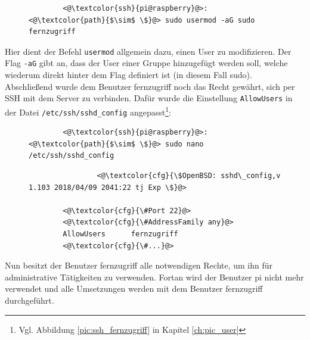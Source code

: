 \documentclass[a4paper, 11pt]{scrartcl}
\begin{document}
\begin{figure}[H]
    \begin{mdframed}[backgroundcolor=bbg]
        \begin{lstlisting}
        <@\textcolor{ssh}{pi@raspberry}@>:<@\textcolor{path}{$\sim$ \$}@> sudo usermod -aG sudo fernzugriff
        \end{lstlisting}
    \end{mdframed}
    \label{lst:usermod_fernzugriff}
\end{figure}
Hier dient der Befehl \lstinline[basicstyle={\small\ttfamily\color{black}}]|usermod| allgemein dazu, einen User zu modifizieren. Der Flag \lstinline[basicstyle={\small\ttfamily\color{black}}]|-aG| gibt an,
dass der User einer Gruppe hinzugefügt werden soll, welche wiederum direkt hinter dem Flag definiert ist (in diesem Fall \glqq sudo\grqq).
\\
Abschließend wurde dem Benutzer \glqq fernzugriff\grqq{} noch das Recht gewährt, sich per SSH mit dem Server zu verbinden. Dafür wurde die Einstellung \lstinline[basicstyle={\small\ttfamily\color{black}}]|AllowUsers|
in der Datei \lstinline[basicstyle={\small\ttfamily\color{black}}]|/etc/ssh/sshd_config| angepasst\footnote{Vgl. Abbildung \ref{pic:ssh_fernzugriff} in Kapitel \ref{ch:pic_user}}:

\begin{figure}[H]
    \begin{mdframed}[backgroundcolor=bbg]
        \begin{lstlisting}
        <@\textcolor{ssh}{pi@raspberry}@>:<@\textcolor{path}{$\sim$ \$}@> sudo nano /etc/ssh/sshd_config
        \end{lstlisting}
    \end{mdframed}
    \label{lst:nano_sshd_config}
\end{figure}
\begin{figure}[H]
    \begin{mdframed}[backgroundcolor=bbg]
        \begin{lstlisting}
                <@\textcolor{cfg}{\$OpenBSD: sshd\_config,v 1.103 2018/04/09 2041:22 tj Exp \$}@>    

        <@\textcolor{cfg}{\#Port 22}@>
        <@\textcolor{cfg}{\#AddressFamily any}@>
        AllowUsers      fernzugriff
        <@\textcolor{cfg}{\#...}@>
        \end{lstlisting}
    \end{mdframed}
    \label{lst:fernzugriff_ssh}
\end{figure}
Nun besitzt der Benutzer \glqq fernzugriff\grqq{} alle notwendigen Rechte, um ihn für administrative Tätigkeiten zu verwenden. Fortan wird der Benutzer \glqq pi\grqq{} nicht mehr verwendet und alle
Umsetzungen werden mit dem Benutzer \glqq fernzugriff\grqq{} durchgeführt.
\end{document}

